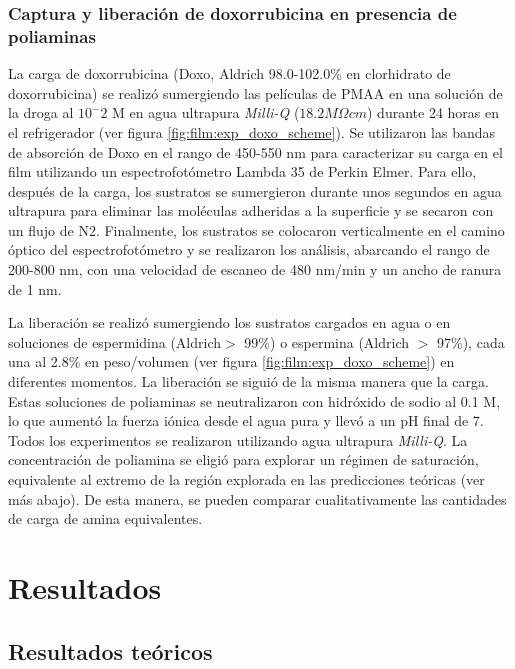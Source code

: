 \subsubsection{Captura y liberaci\'on de doxorrubicina en presencia de poliaminas}


La carga de doxorrubicina (Doxo, Aldrich 98.0-102.0\% en clorhidrato de doxorrubicina) se realiz\'o sumergiendo las pel\'iculas de PMAA en una soluci\'on de la droga al $10^-2$ M en agua ultrapura \textit{Milli-Q} ($18.2 M \Omega cm$) durante 24 horas en el refrigerador (ver figura \ref{fig:film:exp_doxo_scheme}). Se utilizaron las bandas de absorci\'on de Doxo en el rango de 450-550 nm para caracterizar su carga en el film utilizando un espectrofot\'ometro Lambda 35 de Perkin Elmer. Para ello, despu\'es de la carga, los sustratos se sumergieron durante unos segundos en agua ultrapura para eliminar las mol\'eculas adheridas a la superficie y se secaron con un flujo de N2. Finalmente, los sustratos se colocaron verticalmente en el camino \'optico del espectrofot\'ometro y se realizaron los an\'alisis, abarcando el rango de 200-800 nm, con una velocidad de escaneo de 480 nm/min y un ancho de ranura de 1 nm.

La liberaci\'on se realiz\'o sumergiendo los sustratos cargados en agua o en soluciones de espermidina (Aldrich$ >$ 99\%) o espermina (Aldrich $>$ 97\%), cada una al 2.8\% en peso/volumen (ver figura \ref{fig:film:exp_doxo_scheme}) en diferentes momentos. La liberaci\'on se sigui\'o de la misma manera que la carga. Estas soluciones de poliaminas se neutralizaron con hidr\'oxido de sodio al 0.1 M, lo que aument\'o la fuerza i\'onica desde el agua pura y llev\'o a un pH final de 7. Todos los experimentos se realizaron utilizando agua ultrapura \textit{Milli-Q}. La concentraci\'on de poliamina se eligi\'o para explorar un r\'egimen de saturaci\'on, equivalente al extremo de la regi\'on explorada en las predicciones te\'oricas (ver m\'as abajo). De esta manera, se pueden comparar cualitativamente las cantidades de carga de amina equivalentes.






\section{Resultados} \label{sec:film:resultados}

\subsection{Resultados te\'oricos}

